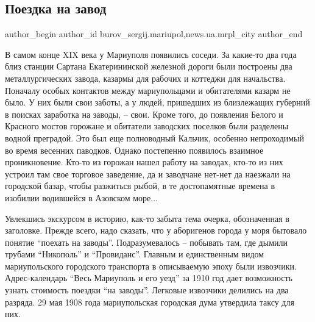  
 
 
 
 
 
\subsection{Поездка на завод}
\label{sec:02_02_2017.stz.news.ua.mrpl_city.1.poezdka_na_zavod}
 
\ifcmt
 author_begin
   author_id burov_sergij.mariupol,news.ua.mrpl_city
 author_end
\fi


В самом конце ΧΙΧ века у Мариуполя появились соседи. За какие-то два года близ
станции Сартана Екатерининской железной дороги были построены два
металлургических завода, казармы для рабочих и коттеджи для начальства.
Поначалу особых контактов между мариупольцами и обитателями казарм не было. У
них были свои заботы, а у людей, пришедших из близлежащих губерний в поисках
заработка на заводы, – свои. Кроме того, до появления Белого и Красного мостов
горожане и обитатели заводских поселков были разделены водной преградой. Это
был еще полноводный Кальчик, особенно непроходимый во время весенних паводков.
Однако постепенно появилось взаимное проникновение. Кто-то из горожан нашел
работу на заводах, кто-то из них устроил там свое торговое заведение, да и
заводчане нет-нет да наезжали на городской базар, чтобы разжиться рыбой, в те
достопамятные времена в изобилии водившейся в Азовском море...

Увлекшись экскурсом в историю, как-то забыта тема очерка, обозначенная в
заголовке. Прежде  всего, надо сказать, что у аборигенов города у моря бытовало
понятие \enquote{поехать на заводы}. Подразумевалось – побывать там, где дымили трубами
\enquote{Никополь} и \enquote{Провиданс}. Главным и единственным видом мариупольского
городского транспорта в описываемую эпоху были извозчики.  Адрес-календарь
\enquote{Весь Мариуполь и его уезд} за 1910 год дает возможность узнать стоимость
поездки \enquote{на заводы}. Легковые извозчики делились на два разряда. 29 мая 1908
года мариупольская городская дума утвердила таксу для них.

